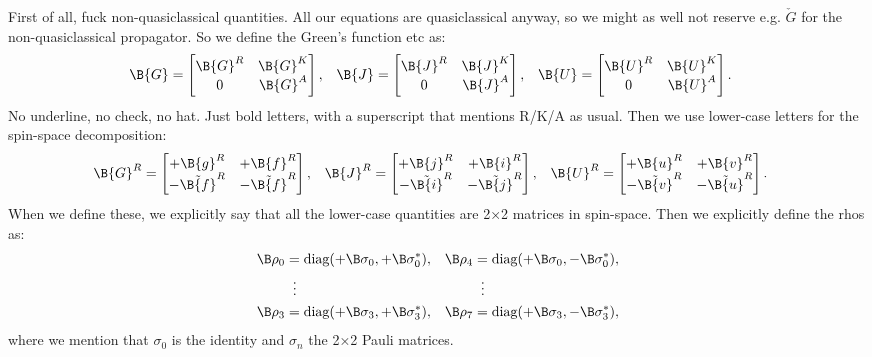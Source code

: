 First of all, fuck non-quasiclassical quantities. All our equations are quasiclassical anyway, so we might as well not reserve e.g. $\check{G}$ for the non-quasiclassical propagator. 
So we define the Green's function etc as:
\begin{align}
\B{G} &= \begin{bmatrix}\B{G}^R & \B{G}^K \\ 0 & \B{G}^A \end{bmatrix}, &
\B{J} &= \begin{bmatrix}\B{J}^R & \B{J}^K \\ 0 & \B{J}^A \end{bmatrix}, &
\B{U} &= \begin{bmatrix}\B{U}^R & \B{U}^K \\ 0 & \B{U}^A \end{bmatrix}.
\end{align}
No underline, no check, no hat. Just bold letters, with a superscript that mentions R/K/A as usual.
Then we use lower-case letters for the spin-space decomposition:
\begin{align}
\B{G}^R &= \begin{bmatrix}+\B{g}^R & +\B{f}^R \\ -\tilde{\B{f}}^R & -\tilde{\B{f}}^R \end{bmatrix}, &
\B{J}^R &= \begin{bmatrix}+\B{j}^R & +\B{i}^R \\ -\tilde{\B{i}}^R & -\tilde{\B{j}}^R \end{bmatrix}, &
\B{U}^R &= \begin{bmatrix}+\B{u}^R & +\B{v}^R \\ -\tilde{\B{v}}^R & -\tilde{\B{u}}^R \end{bmatrix}. &
\end{align}
When we define these, we explicitly say that all the lower-case quantities are 2×2 matrices in spin-space.
Then we explicitly define the rhos as:
\begin{align*}
  \B\rho_0 &= \text{diag}(+\B\sigma_0, +\B\sigma_0^*), &
  \B\rho_4 &= \text{diag}(+\B\sigma_0, -\B\sigma_0^*), \\
         &\;\;\vdots                             &
         &\;\;\vdots                             \\
  \B\rho_3 &= \text{diag}(+\B\sigma_3, +\B\sigma_3^*), &
  \B\rho_7 &= \text{diag}(+\B\sigma_3, -\B\sigma_3^*), \\
\end{align*}
where we mention that $\sigma_0$ is the identity and $\sigma_n$ the 2×2 Pauli matrices.
